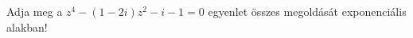 \documentclass[11pt]{scrartcl}
\begin{document}
Adja meg a $z^4 - (1 - 2i) z^2 - i - 1 = 0$ egyenlet összes megoldását
exponenciális alakban!
\end{document}
